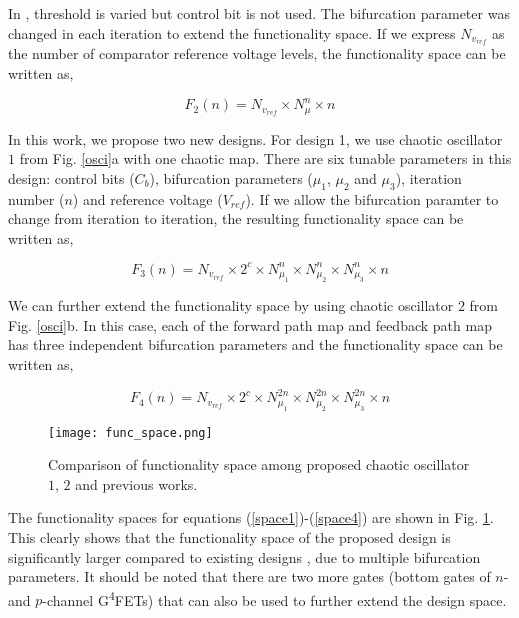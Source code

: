\documentclass[conference]{IEEEtran}
\begin{document}
In \cite{shanta2018design}, threshold is varied but control bit is not used. The bifurcation parameter was changed in each iteration to extend the functionality space. If we express $N_{v_{ref}}$ as the number of comparator reference voltage levels, the functionality space can be written as,

\begin{equation}
F_2(n) = N_{v_{ref}}\times N_{\mu}^n \times n 
\label{space2}
\end{equation}

In this work, we propose two new designs. For design 1, we use chaotic oscillator $1$ from Fig. \ref {osci}a with one chaotic map. There are six tunable parameters in this design: control bits ($C_b$), bifurcation parameters ($\mu_1$, $\mu_2$ and $\mu_3$), iteration number ($n$) and reference voltage ($V_{ref}$). If we allow the bifurcation paramter to change from iteration to iteration, the resulting functionality space can be written as,

\begin{equation}
F_3(n) = N_{v_{ref}}\times2^c\times N_{\mu_1}^n  \times N_{\mu_2}^n  \times N_{\mu_3}^n \times n 
\label{space3}
\end{equation}

We can further extend the functionality space by using chaotic oscillator $2$ from Fig. \ref{osci}b. In this case, each of the forward path map and feedback path map has three independent bifurcation parameters and the functionality space can be written as,

\begin{equation}
F_4(n) = N_{v_{ref}}\times2^c\times N_{\mu_1}^{2n}  \times N_{\mu_2}^{2n}  \times N_{\mu_3}^{2n}  \times n 
\label{space4}
\end{equation}

\begin{figure}
\centering
\texttt{[image: func\_space.png]}
\caption{\small{Comparison of functionality space among proposed chaotic oscillator $1$, $2$ and previous works.}}
\label{fig:func_space}
\end{figure}

The functionality spaces for equations (\ref{space1})-(\ref{space4}) are shown in Fig. \ref{fig:func_space}. This clearly shows that the functionality space of the proposed design is significantly larger compared to existing designs \cite{kia2016simple},\cite{shanta2018design} due to multiple bifurcation parameters. It should be noted that there are two more gates (bottom gates of $n$- and $p$-channel G\textsuperscript4FETs) that can also be used to further extend the design space. 
\end{document}
